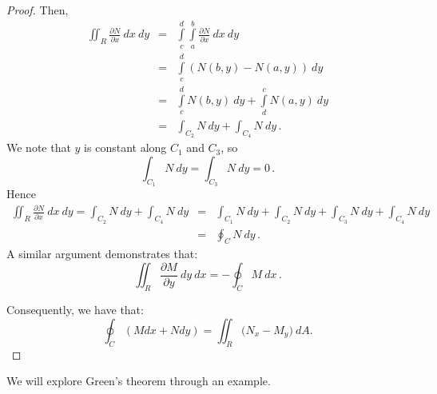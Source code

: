 \begin{proof}
Then,
\begin{eqnarray*}
\displaystyle \iint_R \frac{\partial N}{\partial x} \ dx\ dy &=&  \int\limits_c^d \int\limits_a^b \frac {\partial N} {\partial x}\ dx\ dy \\[0.2cm]
&=& \int\limits_c^d \left({N \left({b, y}\right) - N \left({a, y}\right) }\right) \ dy\\
&=&\int\limits_c^d  N \left({b, y}\right)\ dy+ \int\limits_d^c N \left({a, y}\right)\ dy\\[0.2cm]
&=& \int_{C_2} N \ dy+ \int_{C_4} N\ dy\,.
\end{eqnarray*}
We note that $y$ is constant along $C_1$ and $C_3$, so
$$
\displaystyle \int_{C_1} N \ dy = \int_{C_3} N \ dy = 0\,.
$$ 
Hence
\begin{eqnarray*}
\displaystyle \iint_R \frac{\partial N}{\partial x} \ dx\ dy =\displaystyle \int_{C_2} N\ dy + \int_{C_4} N \ dy&=&\displaystyle \int_{C_1} N \ dy + \int_{C_2} N \ dy + \int_{C_3} N \ dy + \int_{C_4} N \ dy\\[0.2cm]
&=&\oint_C N\ dy\,.
\end{eqnarray*}
A similar argument demonstrates that: 
$$
\displaystyle \iint_R \frac{\partial M}{\partial y} \ dy \ dx = - \oint_C M \ dx\,.
$$

Consequently, we have that:
$$\oint_C (M dx + Ndy) = \iint_R\big(N_x-M_y\big) \ dA.$$

\end{proof}

We will explore Green's theorem through an example.

